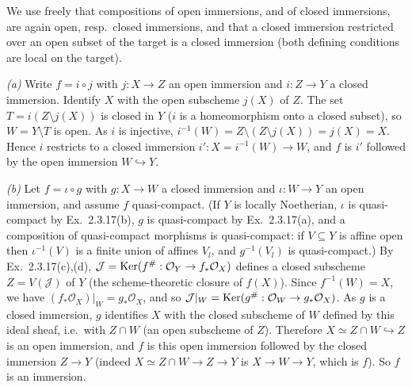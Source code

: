 \documentclass[11pt]{article}
\begin{document}
\pf
We use freely that compositions of open immersions, and of closed immersions, are again open, resp.\ closed immersions, and that a closed immersion restricted over an open subset of the target is a closed immersion (both defining conditions are local on the target).

\emph{(a)} Write $f=i\circ j$ with $j:X\to Z$ an open immersion and $i:Z\to Y$ a closed immersion. Identify $X$ with the open subscheme $j(X)$ of $Z$. The set $T=i(Z\setminus j(X))$ is closed in $Y$ ($i$ is a homeomorphism onto a closed subset), so $W=Y\setminus T$ is open. As $i$ is injective, $i^{-1}(W)=Z\setminus (Z\setminus j(X))=j(X)=X$. Hence $i$ restricts to a closed immersion $i':X=i^{-1}(W)\to W$, and $f$ is $i'$ followed by the open immersion $W\hookrightarrow Y$.

\emph{(b)} Let $f=\iota\circ g$ with $g:X\to W$ a closed immersion and $\iota:W\to Y$ an open immersion, and assume $f$ quasi-compact. (If $Y$ is locally Noetherian, $\iota$ is quasi-compact by Ex.~2.3.17(b), $g$ is quasi-compact by Ex.~2.3.17(a), and a composition of quasi-compact morphisms is quasi-compact: if $V\subseteq Y$ is affine open then $\iota^{-1}(V)$ is a finite union of affines $V_l$, and $g^{-1}(V_l)$ is quasi-compact.) By Ex.~2.3.17(c),(d), $\mathcal J=\operatorname{Ker}(f^\#:\mathcal O_Y\to f_*\mathcal O_X)$ defines a closed subscheme $Z=V(\mathcal J)$ of $Y$ (the scheme-theoretic closure of $f(X)$). Since $f^{-1}(W)=X$, we have $(f_*\mathcal O_X)|_W=g_*\mathcal O_X$, and so $\mathcal J|_W=\operatorname{Ker}(g^\#:\mathcal O_W\to g_*\mathcal O_X)$. As $g$ is a closed immersion, $g$ identifies $X$ with the closed subscheme of $W$ defined by this ideal sheaf, i.e.\ with $Z\cap W$ (an open subscheme of $Z$). Therefore $X\simeq Z\cap W\hookrightarrow Z$ is an open immersion, and $f$ is this open immersion followed by the closed immersion $Z\to Y$ (indeed $X\simeq Z\cap W\to Z\to Y$ is $X\to W\to Y$, which is $f$). So $f$ is an immersion.
\end{document}

